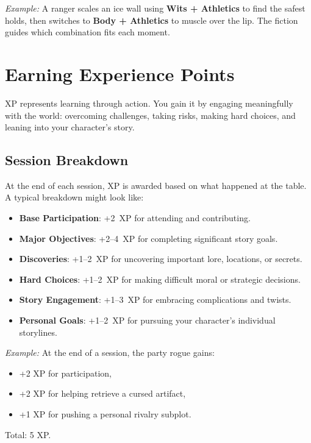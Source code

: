 \emph{Example:} A ranger scales an ice wall using \textbf{Wits + Athletics}
to find the safest holds, then switches to \textbf{Body + Athletics} to muscle over the
lip. The fiction guides which combination fits each moment.

\newpage
\section{Earning Experience Points}
\label{sec:earning-xp}

XP represents learning through action. You gain it by engaging meaningfully
with the world: overcoming challenges, taking risks, making hard choices, and
leaning into your character's story.

\subsection{Session Breakdown}
\label{sec:session-xp}
At the end of each session, XP is awarded based on what happened at the table.
A typical breakdown might look like:

\begin{itemize}
  \item \textbf{Base Participation}: +2~XP for attending and contributing.
  \item \textbf{Major Objectives}: +2--4~XP for completing significant story goals.
  \item \textbf{Discoveries}: +1--2~XP for uncovering important lore, locations, or secrets.
  \item \textbf{Hard Choices}: +1--2~XP for making difficult moral or strategic decisions.
  \item \textbf{Story Engagement}: +1--3~XP for embracing complications and twists.
  \item \textbf{Personal Goals}: +1--2~XP for pursuing your character's individual storylines.
\end{itemize}

\emph{Example:} At the end of a session, the party rogue gains:
\begin{itemize}
  \item +2 XP for participation,
  \item +2 XP for helping retrieve a cursed artifact,
  \item +1 XP for pushing a personal rivalry subplot.
\end{itemize}
Total: 5 XP.

